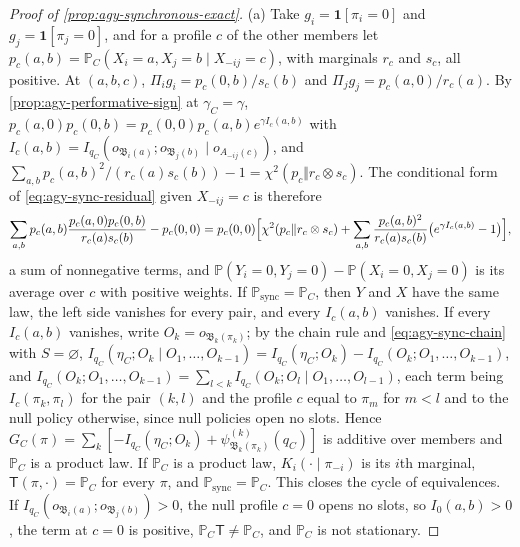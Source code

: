 \begin{proof}[Proof of \cref{prop:agy-synchronous-exact}]
(a) Take $g_i=\mathbf 1[\pi_i=0]$ and $g_j=\mathbf 1[\pi_j=0]$, and for a profile $c$ of the other members let $p_c(a,b)=\mathbb P_C(X_i=a,X_j=b\mid X_{-ij}=c)$, with marginals $r_c$ and $s_c$, all positive. At $(a,b,c)$, $\Pi_ig_i=p_c(0,b)/s_c(b)$ and $\Pi_jg_j=p_c(a,0)/r_c(a)$. By \cref{prop:agy-performative-sign} at $\gamma_C=\gamma$, $p_c(a,0)p_c(0,b)=p_c(0,0)p_c(a,b)e^{\gamma I_c(a,b)}$ with $I_c(a,b)=I_{q_C}(o_{\mathfrak B_i(a)};o_{\mathfrak B_j(b)}\mid o_{A_{-ij}(c)})$, and $\sum_{a,b}p_c(a,b)^2/(r_c(a)s_c(b))-1=\chi^2(p_c\Vert r_c\otimes s_c)$. The conditional form of \eqref{eq:agy-sync-residual} given $X_{-ij}=c$ is therefore
\begin{equation*}
\sum_{a,b}p_c(a,b)\frac{p_c(a,0)p_c(0,b)}{r_c(a)s_c(b)}-p_c(0,0)=p_c(0,0)\Bigl[\chi^2(p_c\Vert r_c\otimes s_c)+\sum_{a,b}\frac{p_c(a,b)^2}{r_c(a)s_c(b)}\bigl(e^{\gamma I_c(a,b)}-1\bigr)\Bigr],
\end{equation*}
a sum of nonnegative terms, and $\mathbb P(Y_i=0,Y_j=0)-\mathbb P(X_i=0,X_j=0)$ is its average over $c$ with positive weights. If $\mathbb P_{\mathrm{sync}}=\mathbb P_C$, then $Y$ and $X$ have the same law, the left side vanishes for every pair, and every $I_c(a,b)$ vanishes. If every $I_c(a,b)$ vanishes, write $O_k=o_{\mathfrak B_k(\pi_k)}$; by the chain rule and \eqref{eq:agy-sync-chain} with $S=\varnothing$, $I_{q_C}(\eta_C;O_k\mid O_1,\dots,O_{k-1})=I_{q_C}(\eta_C;O_k)-I_{q_C}(O_k;O_1,\dots,O_{k-1})$, and $I_{q_C}(O_k;O_1,\dots,O_{k-1})=\sum_{l<k}I_{q_C}(O_k;O_l\mid O_1,\dots,O_{l-1})$, each term being $I_c(\pi_k,\pi_l)$ for the pair $(k,l)$ and the profile $c$ equal to $\pi_m$ for $m<l$ and to the null policy otherwise, since null policies open no slots. Hence $G_C(\pi)=\sum_k[-I_{q_C}(\eta_C;O_k)+\psi^{(k)}_{\mathfrak B_k(\pi_k)}(q_C)]$ is additive over members and $\mathbb P_C$ is a product law. If $\mathbb P_C$ is a product law, $K_i(\cdot\mid\pi_{-i})$ is its $i$th marginal, $\mathsf T(\pi,\cdot)=\mathbb P_C$ for every $\pi$, and $\mathbb P_{\mathrm{sync}}=\mathbb P_C$. This closes the cycle of equivalences. If $I_{q_C}(o_{\mathfrak B_i(a)};o_{\mathfrak B_j(b)})>0$, the null profile $c=0$ opens no slots, so $I_0(a,b)>0$, the term at $c=0$ is positive, $\mathbb P_C\mathsf T\ne\mathbb P_C$, and $\mathbb P_C$ is not stationary.


\end{proof}
